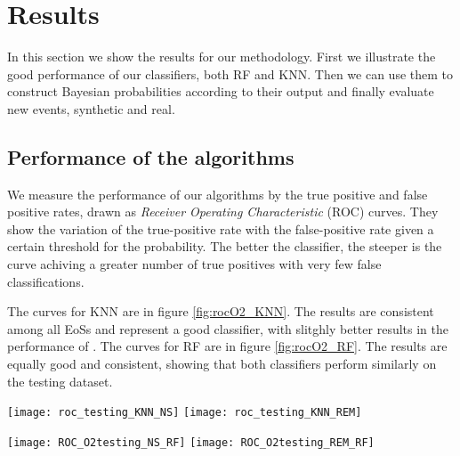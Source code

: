 \section{Results\label{results}}
In this section we show the results for our methodology. First we illustrate the good performance of our classifiers, both \ac{RF} and \ac{KNN}. Then we can use them to construct Bayesian probabilities according to their output and finally evaluate new events, synthetic and real.

\subsection{Performance of the algorithms}
We measure the performance of our algorithms by the true positive and false positive rates, drawn as \textit{Receiver Operating Characteristic} (ROC) curves. They show the variation of the true-positive rate with the false-positive rate given a certain threshold for the probability. The better the classifier, the steeper is the curve achiving a greater number of true positives with very few false classifications.

The curves for \ac{KNN} are in figure \ref{fig:rocO2_KNN}. The results are consistent among all EoSs and represent a good classifier, with slitghly better results in the performance of \hasrem. The curves for \ac{RF} are in figure \ref{fig:rocO2_RF}. The results are equally good and consistent, showing that both classifiers perform similarly on the testing dataset.


\begin{figure*}[h]
\texttt{[image: roc\_testing\_KNN\_NS]}
\texttt{[image: roc\_testing\_KNN\_REM]}
\caption{\label{fig:rocO2_KNN}ROC curves for the testing dataset for \ac{KNN} classfier. All 23 EoS shown in grey, in color the EoSs with minimum and maximum mass, along commonly used SLy.}
\end{figure*}

\begin{figure*}[h]
\texttt{[image: ROC\_O2testing\_NS\_RF]}
\texttt{[image: ROC\_O2testing\_REM\_RF]}
\caption{\label{fig:rocO2_RF}ROC curves for the testing dataset for \ac{RF} classfier. All 23 EoS shown in grey, in color the EoSs with minimum and maximum mass, along commonly used SLy. }
\end{figure*}



